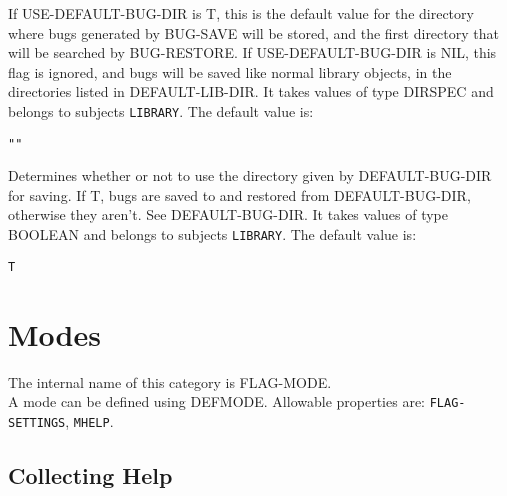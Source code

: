 \begin{description} 
\item[DEFAULT-BUG-DIR]  
If USE-DEFAULT-BUG-DIR is T, this is the default value
for the directory where bugs generated by BUG-SAVE will be stored,
and the first directory that will be searched by BUG-RESTORE.
If USE-DEFAULT-BUG-DIR is NIL, this flag is ignored, and bugs
will be saved like normal library objects, in the directories
listed in DEFAULT-LIB-DIR.
It takes values of type DIRSPEC and belongs to subjects \texttt{LIBRARY}.  The default value is: \begin{lstlisting}
""
\end{lstlisting}

\item[USE-DEFAULT-BUG-DIR]  
Determines whether or not to use the directory given
by DEFAULT-BUG-DIR for saving. If T, bugs are saved to and 
restored from DEFAULT-BUG-DIR, otherwise they aren't.
See DEFAULT-BUG-DIR.
It takes values of type BOOLEAN and belongs to subjects \texttt{LIBRARY}.  The default value is: \begin{lstlisting}
T
\end{lstlisting}

\item
\end{description}
\chapter{Modes}
The internal name of this category is 
FLAG-MODE.\\
A mode can be defined using DEFMODE.
Allowable properties are: \texttt{FLAG-SETTINGS}, \texttt{MHELP}.

\section{Collecting Help}

